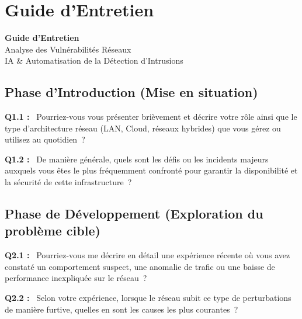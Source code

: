 \documentclass[12pt,a4paper]{report}
\newcommand{\og}{\guillemotleft\,}
\newcommand{\fg}{\,\guillemotright}
\begin{document}
\appendix

\chapter{Guide d'Entretien}

\begin{center}
  {\Large\bfseries Guide d'Entretien}\\[0.4em]
  {\large Analyse des Vuln\'{e}rabilit\'{e}s R\'{e}seaux}\\[0.2em]
  {\normalsize IA \& Automatisation de la D\'{e}tection d'Intrusions}\\[1em]
\end{center}



\vspace{1.2em}

\section{Phase d'Introduction (Mise en situation)}

\textbf{Q1.1 :} \og{} Pourriez-vous vous pr\'{e}senter bri\`{e}vement et d\'{e}crire votre r\^{o}le ainsi que le type d'architecture r\'{e}seau (LAN, Cloud, r\'{e}seaux hybrides) que vous g\'{e}rez ou utilisez au quotidien~? \fg{}

\bigskip

\textbf{Q1.2 :} \og{} De mani\`{e}re g\'{e}n\'{e}rale, quels sont les d\'{e}fis ou les incidents majeurs auxquels vous \^{e}tes le plus fr\'{e}quemment confront\'{e} pour garantir la disponibilit\'{e} et la s\'{e}curit\'{e} de cette infrastructure~? \fg{}

\section{Phase de Développement (Exploration du problème cible)}

\textbf{Q2.1 :} \og{} Pourriez-vous me d\'{e}crire en d\'{e}tail une exp\'{e}rience r\'{e}cente o\`{u} vous avez constat\'{e} un comportement suspect, une anomalie de trafic ou une baisse de performance inexpliquée sur le r\'{e}seau~? \fg{}

\bigskip

\textbf{Q2.2 :} \og{} Selon votre exp\'{e}rience, lorsque le r\'{e}seau subit ce type de perturbations de mani\`{e}re furtive, quelles en sont les causes les plus courantes~? \fg{}
\end{document}
